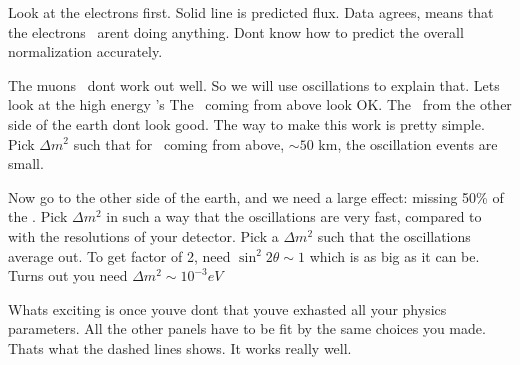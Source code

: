 {Look at the electrons first.
Solid line is predicted flux. 
Data agrees, means that the electrons \nus\ arent doing anything.
Dont know how to predict the overall normalization accurately. 

The muons \nus\ dont work out well. 
So we will use oscillations to explain that.
Lets look at the high energy \numu's
The \nus\ coming from above look OK. 
The \nus\ from the other side of the earth dont look good. 
The way to make this work is pretty simple. 
Pick $\Delta m^2$ such that for \nus\ coming from above, $\sim50$ km, the oscillation events are small. 

Now go to the other side of the earth, and we need a large effect: missing 50\% of the \nus.
Pick $\Delta m^2$ in such a way that the oscillations are very fast, compared to with the resolutions of your detector. 
Pick a $\Delta m^2$ such that the oscillations average out.
To get factor of 2, need $\sin^2 2\theta \sim 1 $ which is as big as it can be. 
Turns out you need $\Delta m^2 \sim 10^{-3} eV$


Whats exciting is once youve dont that youve exhasted all your physics parameters.  
All the other panels have to be fit by the same choices you made. 
Thats what the dashed lines shows. 
It works really well.


}



